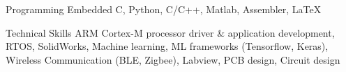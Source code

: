 

\begin{cvskills}

  \cvskill
    {Programming} %
    {Embedded C, Python, C/C++, Matlab, Assembler, \LaTeX} %

  \cvskill
    {Technical Skills} %
    {ARM Cortex-M processor driver \& application development, RTOS, SolidWorks, Machine learning, ML frameworks (Tensorflow, Keras), Wireless Communication (BLE, Zigbee), Labview, PCB design, Circuit design} %


\end{cvskills}
